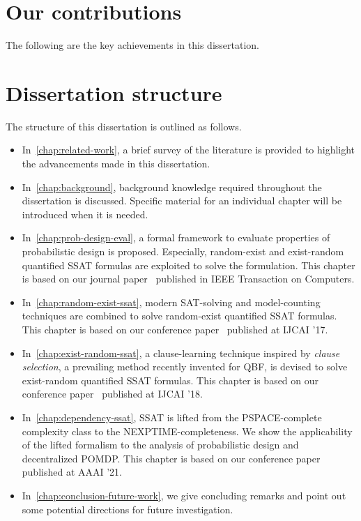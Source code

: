 \section{Our contributions}
The following are the key achievements in this dissertation.

\section{Dissertation structure}
The structure of this dissertation is outlined as follows.
\begin{itemize}
    \item
          In~\cref{chap:related-work}, a brief survey of the literature is provided to highlight the advancements made in this dissertation.
    \item
          In~\cref{chap:background}, background knowledge required throughout the dissertation is discussed.
          Specific material for an individual chapter will be introduced when it is needed.
    \item
          In~\cref{chap:prob-design-eval}, a formal framework to evaluate properties of probabilistic design is proposed.
          Especially, random-exist and exist-random quantified SSAT formulas are exploited to solve the formulation.
          This chapter is based on our journal paper~\cite{LeeTC18ProbDesign} published in IEEE Transaction on Computers.
    \item
          In~\cref{chap:random-exist-ssat}, modern SAT-solving and model-counting techniques are combined to solve random-exist quantified SSAT formulas.
          This chapter is based on our conference paper~\cite{LeeIJCAI17RESSAT} published at IJCAI '17.
    \item
          In~\cref{chap:exist-random-ssat}, a clause-learning technique inspired by \textit{clause selection}, a prevailing method recently invented for QBF, is devised to solve exist-random quantified SSAT formulas.
          This chapter is based on our conference paper~\cite{LeeIJCAI18ERSSAT} published at IJCAI '18.
    \item
          In~\cref{chap:dependency-ssat}, SSAT is lifted from the PSPACE-complete complexity class to the NEXPTIME-completeness.
          We show the applicability of the lifted formalism to the analysis of probabilistic design and decentralized POMDP.
          This chapter is based on our conference paper~\cite{LeeAAAI21DSSAT} published at AAAI '21.
    \item
          In~\cref{chap:conclusion-future-work}, we give concluding remarks and point out some potential directions for future investigation.
\end{itemize}

